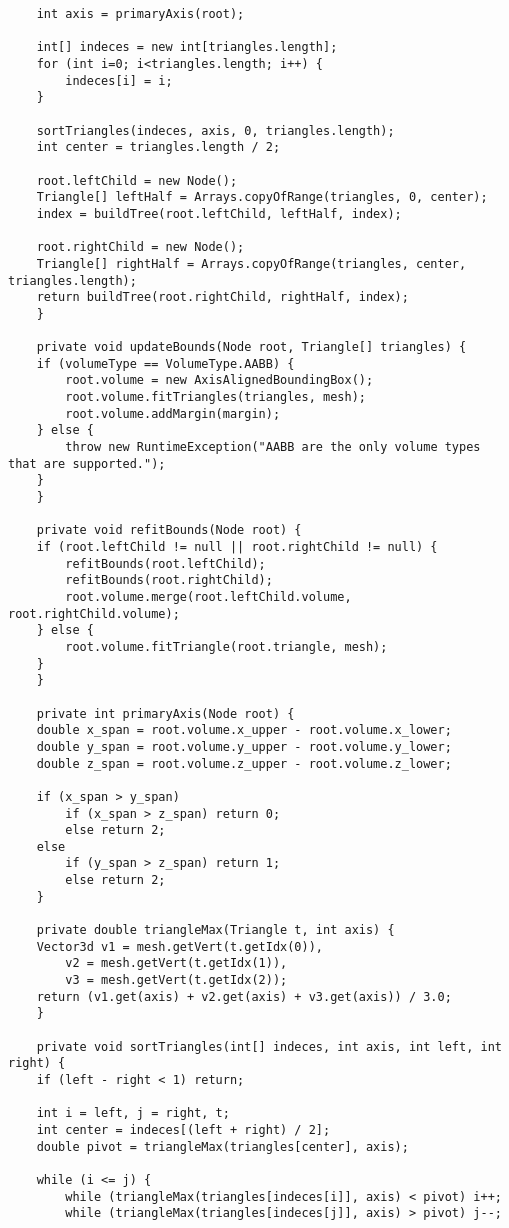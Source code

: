 \begin{lstlisting}
	int axis = primaryAxis(root);

	int[] indeces = new int[triangles.length];
	for (int i=0; i<triangles.length; i++) {
	    indeces[i] = i;
	}

	sortTriangles(indeces, axis, 0, triangles.length);
	int center = triangles.length / 2;

	root.leftChild = new Node();
	Triangle[] leftHalf = Arrays.copyOfRange(triangles, 0, center);
	index = buildTree(root.leftChild, leftHalf, index);
    
	root.rightChild = new Node();
	Triangle[] rightHalf = Arrays.copyOfRange(triangles, center, triangles.length);
	return buildTree(root.rightChild, rightHalf, index);
    }

    private void updateBounds(Node root, Triangle[] triangles) {
	if (volumeType == VolumeType.AABB) {
	    root.volume = new AxisAlignedBoundingBox();
	    root.volume.fitTriangles(triangles, mesh);
	    root.volume.addMargin(margin);
	} else {
	    throw new RuntimeException("AABB are the only volume types that are supported.");
	}
    }

    private void refitBounds(Node root) {
	if (root.leftChild != null || root.rightChild != null) {
	    refitBounds(root.leftChild);
	    refitBounds(root.rightChild);
	    root.volume.merge(root.leftChild.volume, root.rightChild.volume);
	} else {
	    root.volume.fitTriangle(root.triangle, mesh);
	}
    }

    private int primaryAxis(Node root) {
	double x_span = root.volume.x_upper - root.volume.x_lower;
	double y_span = root.volume.y_upper - root.volume.y_lower;
	double z_span = root.volume.z_upper - root.volume.z_lower;

	if (x_span > y_span)
	    if (x_span > z_span) return 0;
	    else return 2;
	else
	    if (y_span > z_span) return 1;
	    else return 2;
    }

    private double triangleMax(Triangle t, int axis) {
	Vector3d v1 = mesh.getVert(t.getIdx(0)), 
	    v2 = mesh.getVert(t.getIdx(1)), 
	    v3 = mesh.getVert(t.getIdx(2));
	return (v1.get(axis) + v2.get(axis) + v3.get(axis)) / 3.0;
    }

    private void sortTriangles(int[] indeces, int axis, int left, int right) {
	if (left - right < 1) return;

	int i = left, j = right, t;
	int center = indeces[(left + right) / 2];
	double pivot = triangleMax(triangles[center], axis);
	
	while (i <= j) {
	    while (triangleMax(triangles[indeces[i]], axis) < pivot) i++;
	    while (triangleMax(triangles[indeces[j]], axis) > pivot) j--;


\end{lstlisting}
